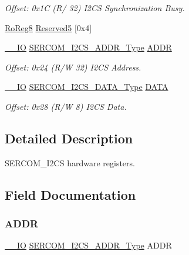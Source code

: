 \begin{DoxyCompactItemize}
\begin{DoxyCompactList}\small\item\em Offset\+: 0x1C (R/ 32) I2\+CS Synchronization Busy. \end{DoxyCompactList}\item 
\mbox{\hyperlink{group___s_a_m_d21_e15_a__definitions_ga0d957f1433aaf5d70e4dc2b68288442d}{Ro\+Reg8}} \mbox{\hyperlink{struct_sercom_i2cs_af634d69e5f383b470ab708b5f102a227}{Reserved5}} \mbox{[}0x4\mbox{]}
\item 
\mbox{\hyperlink{core__cm0plus_8h_aec43007d9998a0a0e01faede4133d6be}{\+\_\+\+\_\+\+IO}} \mbox{\hyperlink{union_s_e_r_c_o_m___i2_c_s___a_d_d_r___type}{S\+E\+R\+C\+O\+M\+\_\+\+I2\+C\+S\+\_\+\+A\+D\+D\+R\+\_\+\+Type}} \mbox{\hyperlink{struct_sercom_i2cs_a91ba3730ee79de3a9731676bf1d327b8}{A\+D\+DR}}
\begin{DoxyCompactList}\small\item\em Offset\+: 0x24 (R/W 32) I2\+CS Address. \end{DoxyCompactList}\item 
\mbox{\hyperlink{core__cm0plus_8h_aec43007d9998a0a0e01faede4133d6be}{\+\_\+\+\_\+\+IO}} \mbox{\hyperlink{union_s_e_r_c_o_m___i2_c_s___d_a_t_a___type}{S\+E\+R\+C\+O\+M\+\_\+\+I2\+C\+S\+\_\+\+D\+A\+T\+A\+\_\+\+Type}} \mbox{\hyperlink{struct_sercom_i2cs_af706164a38adbb9f3f4767f3d8056e84}{D\+A\+TA}}
\begin{DoxyCompactList}\small\item\em Offset\+: 0x28 (R/W 8) I2\+CS Data. \end{DoxyCompactList}\end{DoxyCompactItemize}


\subsection{Detailed Description}
S\+E\+R\+C\+O\+M\+\_\+\+I2\+CS hardware registers. 

\subsection{Field Documentation}
\mbox{\label{struct_sercom_i2cs_a91ba3730ee79de3a9731676bf1d327b8}} 
\subsubsection{\texorpdfstring{ADDR}{ADDR}}
{\footnotesize\ttfamily \mbox{\hyperlink{core__cm0plus_8h_aec43007d9998a0a0e01faede4133d6be}{\+\_\+\+\_\+\+IO}} \mbox{\hyperlink{union_s_e_r_c_o_m___i2_c_s___a_d_d_r___type}{S\+E\+R\+C\+O\+M\+\_\+\+I2\+C\+S\+\_\+\+A\+D\+D\+R\+\_\+\+Type}} A\+D\+DR}



